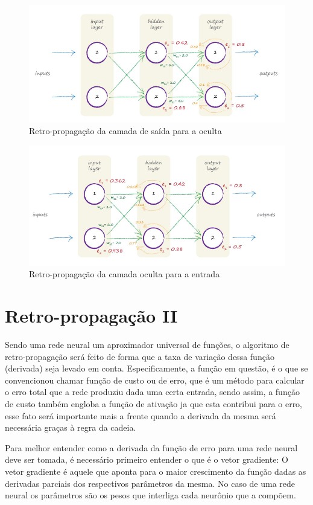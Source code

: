 \begin{apendicesenv}
		\begin{figure}[H]
			\centering
			\caption{Retro-propagação da camada de saída para a oculta}
			\label{fig:backpropagationerros1}
			\includegraphics[width=0.7\linewidth]{images/TEMPbackpropagationErros1}
		\end{figure}
		
		
		\begin{figure}[H]
			\centering
			\caption{Retro-propagação da camada oculta para a entrada}
			\label{fig:backpropagationerros2}
			\includegraphics[width=0.7\linewidth]{images/TEMPbackpropagationErros2}
		\end{figure}
	
	\section{Retro-propagação II}
		\par Sendo uma rede neural um aproximador universal de funções, o algoritmo de retro-propagação será feito de forma que a taxa de variação dessa função (derivada) seja levado em conta. Especificamente, a função em questão, é o que se convencionou chamar função de custo ou de erro, que é um método para calcular o erro total que a rede produziu dada uma certa entrada, sendo assim, a função de custo também engloba a função de ativação ja que esta contribui para o erro, esse fato será importante mais a frente quando a derivada da mesma será necessária graças à regra da cadeia.
		
		\par Para melhor entender como a derivada da função de erro para uma rede neural deve ser tomada, é necessário primeiro entender o que é o vetor gradiente: O vetor gradiente é aquele que aponta para o maior crescimento da função dadas as derivadas parciais dos respectivos parâmetros da mesma. No caso de uma rede neural os parâmetros são os pesos que interliga cada neurônio que a compõem.
		

\end{apendicesenv}
